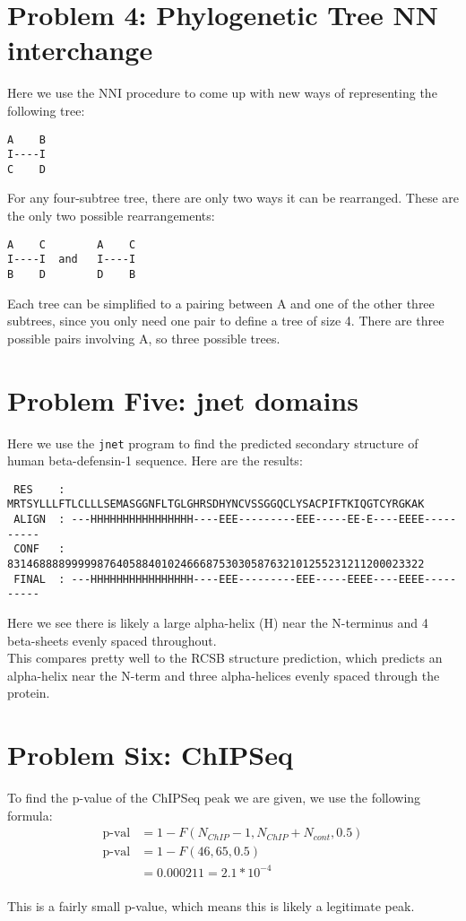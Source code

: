 \documentclass[10pt]{article} %
\begin{document}
\section{Problem 4: Phylogenetic Tree NN interchange}
Here we use the NNI procedure to come up with new ways of representing the following tree:

\begin{verbatim}
A    B
I----I
C    D
\end{verbatim}

For any four-subtree tree, there are only two ways it can be rearranged. These are the only
two possible rearrangements:

\begin{verbatim}
A    C        A    C
I----I  and   I----I
B    D        D    B
\end{verbatim}

Each tree can be simplified to a pairing between A and one of the other three subtrees, since
you only need one pair to define a tree of size 4. There are three possible pairs involving A,
so three possible trees.\\

\section{Problem Five: jnet domains}
Here we use the \texttt{jnet} program to find the predicted secondary structure of human
beta-defensin-1 sequence. Here are the results:\\

\begin{verbatim}
 RES	: MRTSYLLLFTLCLLLSEMASGGNFLTGLGHRSDHYNCVSSGGQCLYSACPIFTKIQGTCYRGKAK
 ALIGN	: ---HHHHHHHHHHHHHHHH----EEE---------EEE-----EE-E----EEEE----------
 CONF	: 83146888899999876405884010246668753030587632101255231211200023322
 FINAL	: ---HHHHHHHHHHHHHHHH----EEE---------EEE-----EEEE----EEEE----------
\end{verbatim}

Here we see there is likely a large alpha-helix (H) near the N-terminus and 4
beta-sheets evenly spaced throughout.\\

This compares pretty well to the RCSB structure prediction, which predicts an
alpha-helix near the N-term and three alpha-helices evenly spaced through the
protein.\\

\section{Problem Six: ChIPSeq}
To find the p-value of the ChIPSeq peak we are given, we use the following formula:\\

\begin{align*}
  \mbox{p-val} &= 1 - F(N_{ChIP}-1,N_{ChIP}+N_{cont}, 0.5)\\
  \mbox{p-val} &= 1 - F(46, 65, 0.5)\\
  &= 0.000211 = 2.1*10^{-4}\\
\end{align*}

This is a fairly small p-value, which means this is likely a legitimate peak.\\
\end{document}
